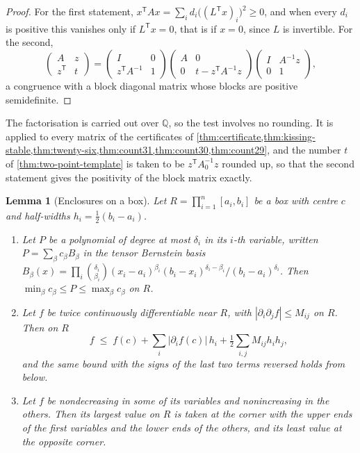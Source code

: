 \documentclass[11pt,reqno]{amsart}
\renewcommand{\_}{\origunderscore\allowbreak}
\numberwithin{equation}{section}
\theoremstyle{plain}
\newtheorem{lem}[thm]{Lemma}
\theoremstyle{definition}
\theoremstyle{remark}
\begin{document}
\begin{proof}
For the first statement, $x^{\mathsf T}Ax=\sum_id_i\bigl((L^{\mathsf T}x)_i\bigr)^2\ge0$,
and when every $d_i$ is positive this vanishes only if $L^{\mathsf T}x=0$,
that is if $x=0$, since $L$ is invertible. For the second,
\[
  \begin{pmatrix}A&z\\ z^{\mathsf T}&t\end{pmatrix}
  =\begin{pmatrix}I&0\\ z^{\mathsf T}A^{-1}&1\end{pmatrix}
   \begin{pmatrix}A&0\\ 0&t-z^{\mathsf T}A^{-1}z\end{pmatrix}
   \begin{pmatrix}I&A^{-1}z\\ 0&1\end{pmatrix},
\]
a congruence with a block diagonal matrix whose blocks are positive
semidefinite.
\end{proof}

The factorisation is carried out over $\mathbb{Q}$, so the test involves
no rounding. It is applied to every matrix of the certificates of
\cref{thm:certificate,thm:kissing-stable,thm:twenty-six,thm:count31,thm:count30,thm:count29},
and the number $t$ of \cref{thm:two-point-template} is taken to be
$z^{\mathsf T}A_0^{-1}z$ rounded up, so that the second statement gives
the positivity of the block matrix exactly.

\begin{lem}[Enclosures on a box]\label{lem:enclosures}
Let $R=\prod_{i=1}^n[a_i,b_i]$ be a box with centre $c$ and half-widths
$h_i=\frac12(b_i-a_i)$.
\begin{enumerate}[label=\textup{(\roman*)},leftmargin=2.2em]
\item Let $P$ be a polynomial of degree at most $\delta_i$ in its $i$-th
variable, written $P=\sum_\beta c_\beta B_\beta$ in the tensor Bernstein
basis
$B_\beta(x)=\prod_i\binom{\delta_i}{\beta_i}(x_i-a_i)^{\beta_i}(b_i-x_i)^{\delta_i-\beta_i}/(b_i-a_i)^{\delta_i}$.
Then $\min_\beta c_\beta\le P\le\max_\beta c_\beta$ on $R$.
\item Let $f$ be twice continuously differentiable near $R$, with
$|\partial_i\partial_jf|\le M_{ij}$ on $R$. Then on $R$
\[
  f\;\le\;f(c)+\sum_i|\partial_if(c)|\,h_i+\tfrac12\sum_{i,j}M_{ij}h_ih_j ,
\]
and the same bound with the signs of the last two terms reversed holds
from below.
\item Let $f$ be nondecreasing in some of its variables and nonincreasing
in the others. Then its largest value on $R$ is taken at the corner with
the upper ends of the first variables and the lower ends of the others,
and its least value at the opposite corner.
\end{enumerate}
\end{lem}
\end{document}
